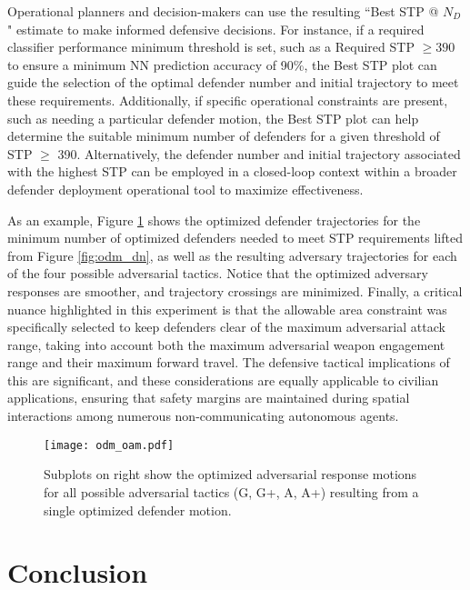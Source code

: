 \documentclass[journal]{IEEEtran} %
\begin{document}
Operational planners and decision-makers can use the resulting ``Best STP @ $N_D$" estimate to make informed defensive decisions. For instance, if a required classifier performance minimum threshold is set, such as a Required STP $\geq 390$ to ensure a minimum NN prediction accuracy of 90\%, the Best STP plot can guide the selection of the optimal defender number and initial trajectory to meet these requirements. Additionally, if specific operational constraints are present, such as needing a particular defender motion, the Best STP plot can help determine the suitable minimum number of defenders for a given threshold of STP $\ge$ 390. Alternatively, the defender number and initial trajectory associated with the highest STP can be employed in a closed-loop context within a broader defender deployment operational tool to maximize effectiveness.

As an example, Figure \ref{fig:odm_oam} shows the optimized defender trajectories for the minimum number of optimized defenders needed to meet STP requirements lifted from Figure \ref{fig:odm_dn}, as well as the resulting adversary trajectories for each of the four possible adversarial tactics. Notice that the optimized adversary responses are smoother, and trajectory crossings are minimized. Finally, a critical nuance highlighted in this experiment is that the allowable area constraint was specifically selected to keep defenders clear of the maximum adversarial attack range, taking into account both the maximum adversarial weapon engagement range and their maximum forward travel. The defensive tactical implications of this are significant, and these considerations are equally applicable to civilian applications, ensuring that safety margins are maintained during spatial interactions among numerous non-communicating autonomous agents.

\begin{figure}[h]
    \centering
    \texttt{[image: odm\_oam.pdf]}
    \caption{Subplots on right show the optimized adversarial response motions for all possible adversarial tactics (G, G+, A, A+) resulting from a single optimized defender motion.}
    \label{fig:odm_oam}
\end{figure}



\section{Conclusion}
\end{document}
